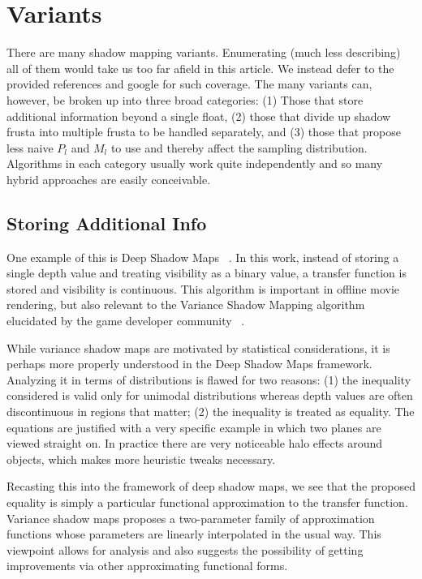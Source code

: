 \documentclass[]{article}  %
\begin{document}
\section{Variants}

There are many shadow mapping variants.  Enumerating (much less describing) all of them would take us too far afield in this article.  We instead defer to the provided references and google for such coverage.  The many variants can, however, be broken up into three broad categories: (1) Those that store additional information beyond a single float, (2) those that divide up shadow frusta into multiple frusta to be handled separately, and (3) those that propose less naive $P_l$ and $M_l$ to use and thereby affect the sampling distribution.  Algorithms in each category usually work quite independently and so many hybrid approaches are easily conceivable.  

\subsection{Storing Additional Info}
One example of this is Deep Shadow Maps ~\cite{LV00}.  In this work, instead of storing a single depth value and treating visibility as a binary value, a transfer function is stored and visibility is continuous.  This algorithm is important in offline movie rendering, but also relevant to the Variance Shadow Mapping algorithm elucidated by the game developer community ~\cite{DL06}.  

While variance shadow maps are motivated by statistical considerations, it is perhaps more properly understood in the Deep Shadow Maps framework.  Analyzing it in terms of distributions is flawed for two reasons: (1) the inequality considered is valid only for unimodal distributions whereas depth values are often discontinuous in regions that matter; (2) the inequality is treated as equality.  The equations are justified with a very specific example in which two planes are viewed straight on.  In practice there are very noticeable halo effects around objects, which makes more heuristic tweaks necessary.

Recasting this into the framework of deep shadow maps, we see that the proposed equality is simply a particular functional approximation to the transfer function.  Variance shadow maps proposes a two-parameter family of approximation functions whose parameters are linearly interpolated in the usual way.  This viewpoint allows for analysis and also suggests the possibility of getting improvements via other approximating functional forms.  
\end{document}
